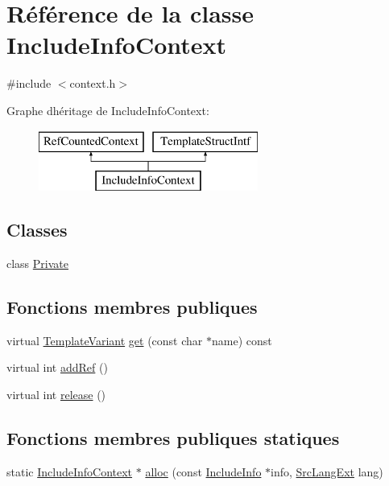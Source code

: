 \hypertarget{class_include_info_context}{}\section{Référence de la classe Include\+Info\+Context}
\label{class_include_info_context}


{\ttfamily \#include $<$context.\+h$>$}

Graphe d\textquotesingle{}héritage de Include\+Info\+Context\+:\begin{figure}[H]
\begin{center}
\leavevmode
\includegraphics[height=2.000000cm]{class_include_info_context}
\end{center}
\end{figure}
\subsection*{Classes}
\begin{DoxyCompactItemize}
\item 
class \hyperlink{class_include_info_context_1_1_private}{Private}
\end{DoxyCompactItemize}
\subsection*{Fonctions membres publiques}
\begin{DoxyCompactItemize}
\item 
virtual \hyperlink{class_template_variant}{Template\+Variant} \hyperlink{class_include_info_context_a5fd73342836c8c1d1faae2cf0707e371}{get} (const char $\ast$name) const 
\item 
virtual int \hyperlink{class_include_info_context_a0de1d814488fa964c23ec201832f7ca7}{add\+Ref} ()
\item 
virtual int \hyperlink{class_include_info_context_a85637ec320e16700349765ab31878ded}{release} ()
\end{DoxyCompactItemize}
\subsection*{Fonctions membres publiques statiques}
\begin{DoxyCompactItemize}
\item 
static \hyperlink{class_include_info_context}{Include\+Info\+Context} $\ast$ \hyperlink{class_include_info_context_abe28271dba740db999e5fdc0ed444547}{alloc} (const \hyperlink{struct_include_info}{Include\+Info} $\ast$info, \hyperlink{types_8h_a9974623ce72fc23df5d64426b9178bf2}{Src\+Lang\+Ext} lang)
\end{DoxyCompactItemize}


